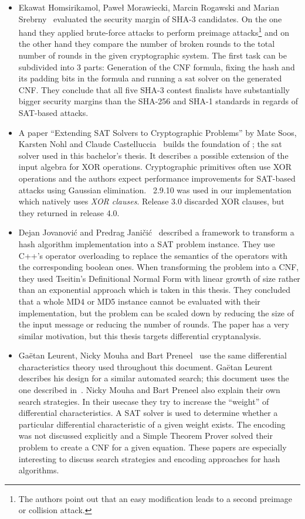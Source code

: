 \begin{itemize}
  \item
Ekawat Homsirikamol, Paweł Morawiecki, Marcin Rogawski and Marian Srebrny~\cite{Cry04} evaluated the security margin of SHA-3 candidates. On the one hand they applied brute-force attacks to perform preimage attacks\footnote{The authors point out that an easy modification leads to a second preimage or collision attack.} and on the other hand they compare the number of broken rounds to the total number of rounds in the given cryptographic system. The first task can be subdivided into 3 parts: Generation of the CNF formula, fixing the hash and its padding bits in the formula and running a \gls{sat} solver on the generated CNF. They conclude that all five SHA-3 contest finalists have substantially bigger security margins than the SHA-256 and SHA-1 standards in regards of SAT-based attacks.
  \item
A paper ``Extending SAT Solvers to Cryptographic Problems'' by Mate Soos, Karsten Nohl and Claude Castelluccia~\cite{Cry06} builds the foundation of \cmsat{}; the \gls{sat} solver used in this bachelor's thesis. It describes a possible extension of the input algebra for XOR operations. Cryptographic primitives often use XOR operations and the authors expect performance improvements for SAT-based attacks using Gaussian elimination. \cmsat{}~2.9.10 was used in our implementation which natively uses \emph{XOR clauses}. Release \cmsat{} 3.0 discarded XOR clauses, but they returned in release 4.0.
  \item
Dejan Jovanović and Predrag Janičić~\cite{Sat03} described a framework to transform a hash algorithm implementation into a SAT problem instance. They use C++'s operator overloading to replace the semantics of the operators with the corresponding boolean ones. When transforming the problem into a CNF, they used Tseitin's Definitional Normal Form with linear growth of size rather than an exponential approach which is taken in this thesis. They concluded that a whole MD4 or MD5 instance cannot be evaluated with their implementation, but the problem can be scaled down by reducing the size of the input message or reducing the number of rounds. The paper has a very similar motivation, but this thesis targets differential cryptanalysis.
  \item
Gaëtan Leurent, Nicky Mouha and Bart Preneel~\cite{Sat10}\cite{Sat11} use the same differential characteristics theory used throughout this document. Gaëtan Leurent describes his design for a similar automated search; this document uses the one described in~\cite{Cry07}. Nicky Mouha and Bart Preneel also explain their own search strategies. In their usecase they try to increase the ``weight'' of differential characteristics. A SAT solver is used to determine whether a particular differential characteristic of a given weight exists. The encoding was not discussed explicitly and a Simple Theorem Prover solved their problem to create a CNF for a given equation. These papers are especially interesting to discuss search strategies and encoding approaches for hash algorithms.
\end{itemize}

